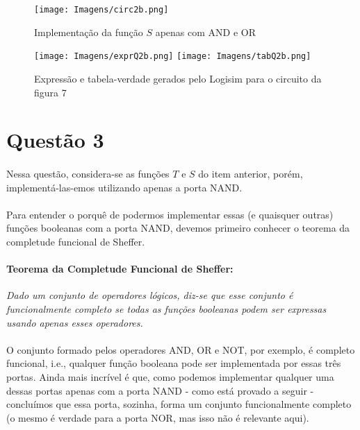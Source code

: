 \documentclass[a4paper, 12pt]{article}
\begin{document}
\begin{figure}[H]
    \centering
    \texttt{[image: Imagens/circ2b.png]}
    \caption{Implementação da função $S$ apenas com AND e OR}
\end{figure}

\begin{figure}[H]
    \centering
    \texttt{[image: Imagens/exprQ2b.png]}
    \texttt{[image: Imagens/tabQ2b.png]} \\
    \caption{Expressão e tabela-verdade gerados pelo Logisim para o circuito da figura 7}
\end{figure}

\section{Questão 3}
\paragraph{}
Nessa questão, considera-se as funções $T$ e $S$ do item anterior, porém, implementá-las-emos utilizando apenas a porta NAND.

\paragraph{}
Para entender o porquê de podermos implementar essas (e quaisquer outras) funções booleanas com a porta NAND, devemos primeiro conhecer o teorema da completude funcional de Sheffer.

\paragraph{Teorema da Completude Funcional de Sheffer:}
\textit{Dado um conjunto de operadores lógicos, diz-se que esse conjunto é funcionalmente completo se todas as funções booleanas podem ser expressas usando apenas esses operadores.}

\paragraph{}
O conjunto formado pelos operadores AND, OR e NOT, por exemplo, é completo funcional, i.e., qualquer função booleana pode ser implementada por essas três portas. Ainda mais incrível é que, como podemos implementar qualquer uma dessas portas apenas com a porta NAND - como está provado a seguir - concluímos que essa porta, sozinha, forma um conjunto funcionalmente completo (o mesmo é verdade para a porta NOR, mas isso não é relevante aqui).
\end{document}
